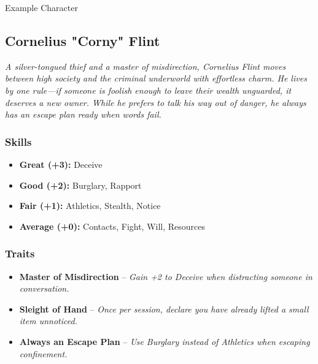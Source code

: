 \begin{DndSidebar}[float=!b]{Example Character}
\subsection{Cornelius "Corny" Flint}
\emph{A silver-tongued thief and a master of misdirection, Cornelius Flint moves between high society and the criminal underworld with effortless charm. He lives by one rule—if someone is foolish enough to leave their wealth unguarded, it deserves a new owner. While he prefers to talk his way out of danger, he always has an escape plan ready when words fail.}

\subsubsection*{Skills}
\begin{itemize}
    \item \textbf{Great (+3):} Deceive
    \item \textbf{Good (+2):} Burglary, Rapport
    \item \textbf{Fair (+1):} Athletics, Stealth, Notice
    \item \textbf{Average (+0):} Contacts, Fight, Will, Resources
\end{itemize}

\subsubsection*{Traits}
\begin{itemize}
    \item \textbf{Master of Misdirection} – \emph{Gain +2 to Deceive when distracting someone in conversation.}
    \item \textbf{Sleight of Hand} – \emph{Once per session, declare you have already lifted a small item unnoticed.}
    \item \textbf{Always an Escape Plan} – \emph{Use Burglary instead of Athletics when escaping confinement.}
\end{itemize}
\end{DndSidebar}

